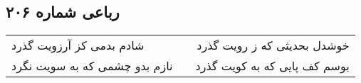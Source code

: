 \begin{center}
\section*{رباعی شماره ۲۰۶}
\label{sec:sh206}
\begin{longtable}{l p{0.5cm} r}
شادم بدمی کز آرزویت گذرد
&&
خوشدل بحدیثی که ز رویت گذرد
\\
نازم بدو چشمی که به سویت نگرد
&&
بوسم کف پایی که به کویت گذرد
\\
\end{longtable}
\end{center}
